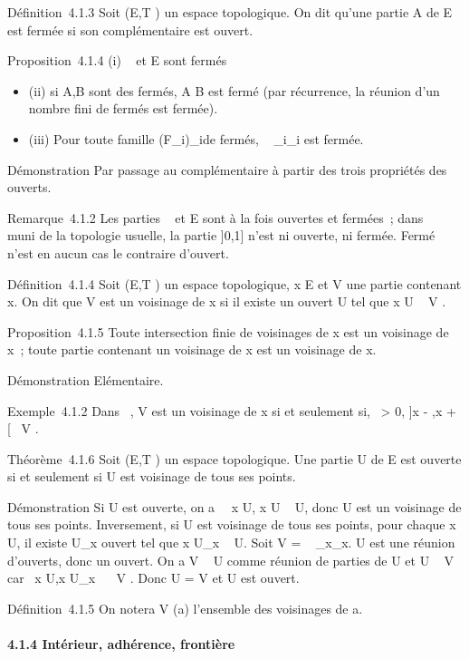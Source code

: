 \documentclass[]{article}
\begin{document}
Définition~4.1.3 Soit (E,T ) un espace topologique. On dit qu'une partie
A de E est fermée si son complémentaire est ouvert.

Proposition~4.1.4 (i) \varnothing~ et E sont fermés

\begin{itemize}
\itemsep1pt\parskip0pt
\item
  (ii) si A,B sont des fermés, A \cup B est fermé (par récurrence, la
  réunion d'un nombre fini de fermés est fermée).
\item
  (iii) Pour toute famille (F_i)_i\inI de fermés,
  \⋂ ~
  _i\inIF_i est fermée.
\end{itemize}

Démonstration Par passage au complémentaire à partir des trois
propriétés des ouverts.

Remarque~4.1.2 Les parties \varnothing~ et E sont à la fois ouvertes et fermées~;
dans ~ muni de la topologie usuelle, la partie ]0,1] n'est ni
ouverte, ni fermée. Fermé n'est en aucun cas le contraire d'ouvert.

Définition~4.1.4 Soit (E,T ) un espace topologique, x \in E et V une
partie contenant x. On dit que V est un voisinage de x si il existe un
ouvert U tel que x \in U \subset~ V .

Proposition~4.1.5 Toute intersection finie de voisinages de x est un
voisinage de x~; toute partie contenant un voisinage de x est un
voisinage de x.

Démonstration Elémentaire.

Exemple~4.1.2 Dans ~, V est un voisinage de x si et seulement si,
\exists~\epsilon > 0, ]x - \epsilon,x + \epsilon[\subset~ V .

Théorème~4.1.6 Soit (E,T ) un espace topologique. Une partie U de E est
ouverte si et seulement si U est voisinage de tous ses points.

Démonstration Si U est ouverte, on a \forall~~x \in U, x
\in U \subset~ U, donc U est un voisinage de tous ses points. Inversement, si U
est voisinage de tous ses points, pour chaque x \in U, il existe
U_x ouvert tel que x \in U_x \subset~ U. Soit V
= \⋃ ~
_x\inUU_x. U est une réunion d'ouverts, donc un ouvert. On
a V \subset~ U comme réunion de parties de U et U \subset~ V car
\forall~x \in U,x \in U_x~ \subset~ V . Donc U = V et U
est ouvert.

Définition~4.1.5 On notera V (a) l'ensemble des voisinages de a.

\paragraph{4.1.4 Intérieur, adhérence, frontière}
\end{document}
